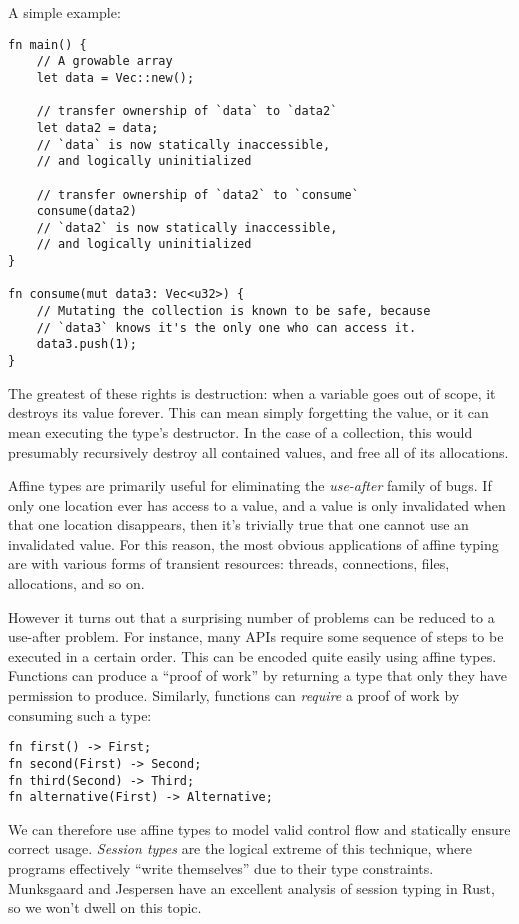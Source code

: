 A simple example:

\begin{verbatim}
fn main() {
    // A growable array
    let data = Vec::new();

    // transfer ownership of `data` to `data2`
    let data2 = data;
    // `data` is now statically inaccessible,
    // and logically uninitialized

    // transfer ownership of `data2` to `consume`
    consume(data2)
    // `data2` is now statically inaccessible,
    // and logically uninitialized
}

fn consume(mut data3: Vec<u32>) {
    // Mutating the collection is known to be safe, because
    // `data3` knows it's the only one who can access it.
    data3.push(1);
}
\end{verbatim}

The greatest of these rights is destruction: when a variable goes out of scope,
it destroys its value forever. This can mean simply forgetting the value,
or it can mean executing the type's destructor. In the case of a collection,
this would presumably recursively destroy all contained values, and free all of
its allocations.

Affine types are primarily useful for eliminating the \emph{use-after} family of bugs.
If only one location ever has access to a value, and a value is only invalidated
when that one location disappears, then it's trivially true that one cannot use
an invalidated value. For this reason, the most obvious applications of affine
typing are with various forms of transient resources: threads, connections,
files, allocations, and so on.

However it turns out that a surprising number of problems can be reduced to a
use-after problem. For instance, many APIs require some sequence of steps to
be executed in a certain order. This can be encoded quite easily using affine
types. Functions can produce a ``proof of work'' by returning a type that only
they have permission to produce. Similarly, functions can \emph{require} a proof
of work by consuming such a type:

\begin{verbatim}
fn first() -> First;
fn second(First) -> Second;
fn third(Second) -> Third;
fn alternative(First) -> Alternative;
\end{verbatim}

We can therefore use affine types to model valid control flow and statically
ensure correct usage. \emph{Session types} are the logical extreme of this
technique, where programs effectively ``write themselves'' due to their type
constraints. Munksgaard and Jespersen \cite{munksgaard2015practical} have an
excellent analysis of session typing in Rust, so we won't dwell on this topic.


